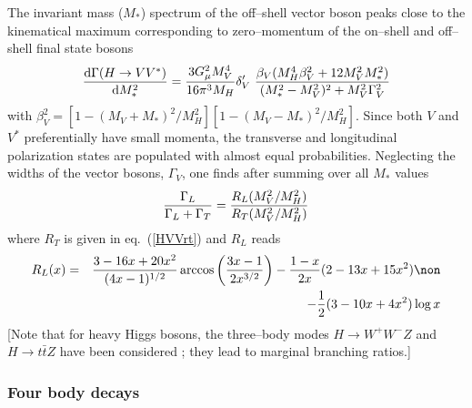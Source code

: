 The invariant mass ($M_*$) spectrum of the off--shell vector boson peaks close 
to the kinematical maximum corresponding to zero--momentum of the on--shell and 
off--shell final state bosons 
\begin{eqnarray}
\frac{{\rm d} \Gamma (H \to VV^*)}{{\rm d}M_*^2} = \frac{3G_\mu^2 M_V^4} {16 \pi^3M_H}
\delta_V' \ \frac{\beta_V (M_H^4\beta_V^2 + 12M_V^2 M_*^2)}{(M_*^2-M_V^2)^2+
M_V^2 \Gamma_V^2} 
\label{dGHVV*}
\end{eqnarray}
with $\beta_V^2=[1-(M_V+M_*)^2/M_H^2][1-(M_V-M_*)^2/M_H^2]$.
Since both $V$ and $V^*$ preferentially have small momenta, the
transverse and longitudinal polarization states are populated with almost equal
probabilities. Neglecting the widths of the vector bosons, $\Gamma_V$, one finds
after summing over all $M_*$ values 
\begin{eqnarray}
{\Gamma_L \over \Gamma_L+\Gamma_T}= {R_L(M_V^2/M_H^2) \over R_T(M_V^2/M_H^2)}
\end{eqnarray}
where $R_T$ is given in eq.~(\ref{HVVrt}) and $R_L$ reads \cite{Bargeretal} 
\begin{eqnarray}
R_L(x)&=&\frac{3-16x+20x^2} {(4x-1)^{1/2}} \arccos \left( \frac{3x-1}{2x^{3/2}}
\right) -\frac{1-x}{2x} (2-13x+15x^2) \non \\ &&
- \frac{1}{2}(3-10x+4x^2) \log x
\end{eqnarray}
[Note that for heavy Higgs bosons, the three--body modes $H \to W^+W^- Z$ 
and $H \to t\bar{t}Z$ have been considered \cite{Three-Body2,Three-Body3}; 
they lead to marginal branching ratios.]
 
\subsubsection{Four body decays}

